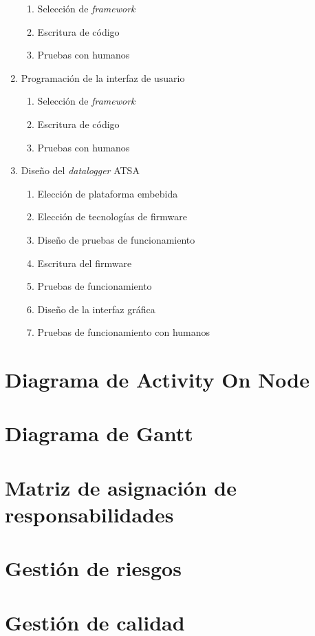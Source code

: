\documentclass[
12pt,
spanish,
singlespacing,
parskip,
headsepline,]{article}
\begin{document}
\begin{enumerate}
	\begin{enumerate}
		\item Selección de \emph{framework}
		\item Escritura de código
		\item Pruebas con humanos
	\end{enumerate}
	\item Programación de la interfaz de usuario
	\begin{enumerate}
		\item Selección de \emph{framework}
		\item Escritura de código
		\item Pruebas con humanos
	\end{enumerate}
	\item Diseño del \emph{datalogger} ATSA
	\begin{enumerate}
		\item Elección de plataforma embebida
		\item Elección de tecnologías de firmware
		\item Diseño de pruebas de funcionamiento
		\item Escritura del firmware
		\item Pruebas de funcionamiento
		\item Diseño de la interfaz gráfica
		\item Pruebas de funcionamiento con humanos
	\end{enumerate}
	
\end{enumerate}

\section{Diagrama de Activity On Node}

\section{Diagrama de Gantt}

\section{Matriz de asignación de responsabilidades}

\section{Gestión de riesgos}

\section{Gestión de calidad}
\end{document}
